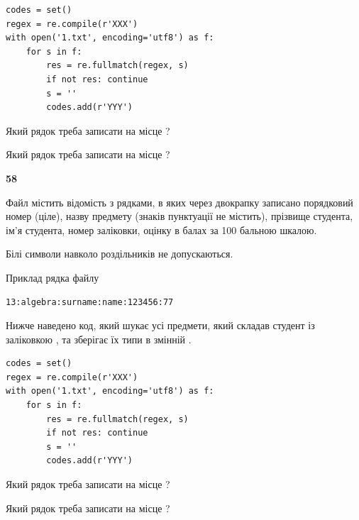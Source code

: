 \begin{verbatim}
codes = set()
regex = re.compile(r'XXX')
with open('1.txt', encoding='utf8') as f:
    for s in f:
        res = re.fullmatch(regex, s)
        if not res: continue
        s = ''
        codes.add(r'YYY')
\end{verbatim}





Який рядок треба записати на місце  ?\par
\vspace{5mm}


Який рядок треба записати на місце  ?\par


\newpage

{\begin {center}\textbf{ 58}\end {center}}\par
Файл  містить відомість з рядками, в яких через двокрапку записано поряд\-ковий номер (ціле), назву предмету (знаків пунктуації не містить), прізвище студента, ім'я студента, номер заліковки, оцінку в балах за 100 бальною шкалою.

Білі символи навколо роздільників не допускаються.

Приклад рядка файлу



\begin{verbatim}
13:algebra:surname:name:123456:77
\end{verbatim}


Нижче наведено код, який шукає усі предмети, який складав студент із заліковкою , та зберігає їх типи в змінній .



\begin{verbatim}
codes = set()
regex = re.compile(r'XXX')
with open('1.txt', encoding='utf8') as f:
    for s in f:
        res = re.fullmatch(regex, s)
        if not res: continue
        s = ''
        codes.add(r'YYY')
\end{verbatim}





Який рядок треба записати на місце  ?\par
\vspace{5mm}


Який рядок треба записати на місце  ?\par


